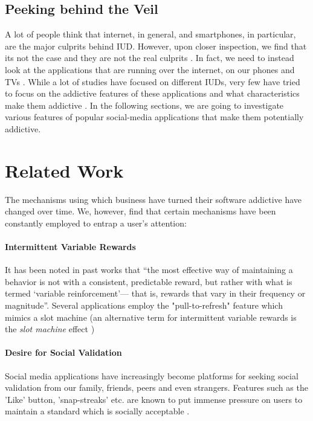 \documentclass[conference]{IEEEtran}
\begin{document}
\subsection{Peeking behind the Veil}
A lot of people think that internet, in general, and smartphones, in particular, are the major culprits behind IUD. However, upon closer inspection, we find that its not the case and they are not the real culprits \cite{sha2019}. In fact, we need to instead look at the applications that are running over the internet, on our phones and TVs \cite{alter2017}. While a lot of studies have focused on different IUDs, very few have tried to focus on the addictive features of these applications and what characteristics make them addictive \cite{king11, alu18}.
In the following sections, we are going to investigate various features of popular social-media applications that make them potentially addictive.


\section{Related Work}
The mechanisms using which business have turned their software addictive have changed over time. We, however, find that certain mechanisms have been constantly employed to entrap a user's attention:

\paragraph{Intermittent Variable Rewards} It has been noted in past works \cite{wu2016} that “the most effective way of maintaining a behavior is not with a consistent, predictable reward, but rather with what is termed ‘variable reinforcement’— that is, rewards that vary in their frequency or magnitude”. Several applications employ the "pull-to-refresh" feature which mimics a slot machine (an alternative term for intermittent variable rewards is the {\it slot machine} effect \cite{wu2016, gr2018})

\paragraph{Desire for Social Validation} Social media applications have increasingly become platforms for seeking social validation from our family, friends, peers and even strangers. Features such as the 'Like' button, 'snap-streaks' etc. are known to put immense pressure on users to maintain a standard which is socially acceptable \cite{bosker2016, alter2017}.
\end{document}
